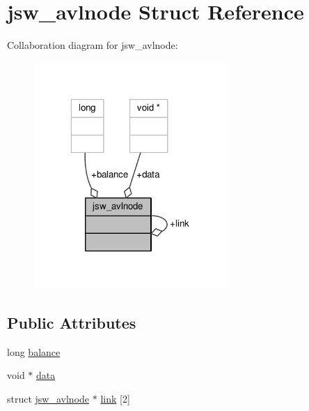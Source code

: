 \hypertarget{structjsw__avlnode}{\section{jsw\-\_\-avlnode Struct Reference}
\label{structjsw__avlnode}
}


Collaboration diagram for jsw\-\_\-avlnode\-:
\nopagebreak
\begin{figure}[H]
\begin{center}
\leavevmode
\includegraphics[width=208pt]{structjsw__avlnode__coll__graph}
\end{center}
\end{figure}
\subsection*{Public Attributes}
\begin{DoxyCompactItemize}
\item 
long \hyperlink{structjsw__avlnode_a73ff0e730ededb2e85dff0eefbb8d6ae}{balance}
\item 
void $\ast$ \hyperlink{structjsw__avlnode_a88870a15890591a8a14f207d74024240}{data}
\item 
struct \hyperlink{structjsw__avlnode}{jsw\-\_\-avlnode} $\ast$ \hyperlink{structjsw__avlnode_ad767c30f18c6d3e4f6598aadeb31736a}{link} \mbox{[}2\mbox{]}
\end{DoxyCompactItemize}


